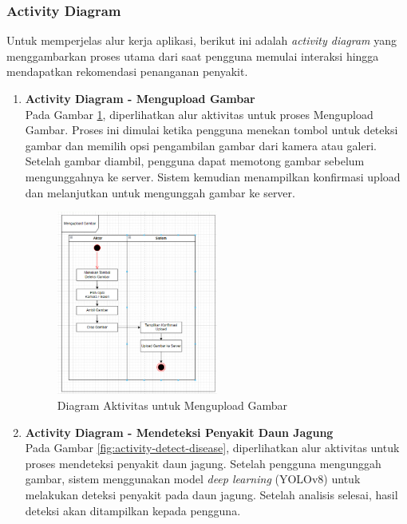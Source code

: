 \documentclass[journal,article,submit,pdftex,moreauthors]{Definitions/mdpi}
\begin{document}
\subsubsection{Activity Diagram}
Untuk memperjelas alur kerja aplikasi, berikut ini adalah \textit{activity diagram} yang menggambarkan proses utama dari saat pengguna memulai interaksi hingga mendapatkan rekomendasi penanganan penyakit.

\begin{enumerate}[label=\alph*)]
    \item \textbf{Activity Diagram - Mengupload Gambar} \\
    Pada Gambar \ref{fig:activity-upload-gambar}, diperlihatkan alur aktivitas untuk proses Mengupload Gambar. Proses ini dimulai ketika pengguna menekan tombol untuk deteksi gambar dan memilih opsi pengambilan gambar dari kamera atau galeri. Setelah gambar diambil, pengguna dapat memotong gambar sebelum mengunggahnya ke server. Sistem kemudian menampilkan konfirmasi upload dan melanjutkan untuk mengunggah gambar ke server.
    
    \begin{figure}[H]
        \centering
        \includegraphics[width=0.5\textwidth]{Images/activity_upload.png}
        \caption{\centering Diagram Aktivitas untuk Mengupload Gambar}
        \label{fig:activity-upload-gambar}
    \end{figure}

    \item \textbf{Activity Diagram - Mendeteksi Penyakit Daun Jagung} \\
    Pada Gambar \ref{fig:activity-detect-disease}, diperlihatkan alur aktivitas untuk proses mendeteksi penyakit daun jagung. Setelah pengguna mengunggah gambar, sistem menggunakan model \textit{deep learning} (YOLOv8) untuk melakukan deteksi penyakit pada daun jagung. Setelah analisis selesai, hasil deteksi akan ditampilkan kepada pengguna.


\end{enumerate}
\end{document}
